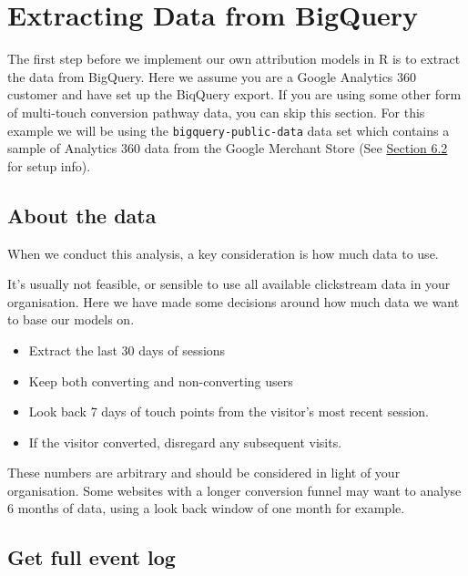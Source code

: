 \documentclass[]{book}
\providecommand{\tightlist}{%
  \setlength{\itemsep}{0pt}\setlength{\parskip}{0pt}}
\begin{document}
\hypertarget{extracting-data-from-bigquery}{%
\chapter{Extracting Data from BigQuery}\label{extracting-data-from-bigquery}}

The first step before we implement our own attribution models in R is to extract
the data from BigQuery. Here we assume you are a Google Analytics 360 customer and have set up the
BiqQuery export. If you are using some other form of multi-touch conversion pathway data, you
can skip this section. For this example we will be using the \texttt{bigquery-public-data} data set which
contains a sample of Analytics 360 data from the Google Merchant Store (See
\protect\hyperlink{setup-1}{Section 6.2} for setup info).

\hypertarget{about-the-data}{%
\section{About the data}\label{about-the-data}}

When we conduct this analysis, a key consideration is how much data to use.

It's usually not feasible, or sensible to use all available clickstream data
in your organisation. Here we have made some decisions around how much data we
want to base our models on.

\begin{itemize}
\tightlist
\item
  Extract the last 30 days of sessions\\
\item
  Keep both converting and non-converting users\\
\item
  Look back 7 days of touch points from the visitor's most recent session.\\
\item
  If the visitor converted, disregard any subsequent visits.
\end{itemize}

These numbers are arbitrary and should be considered in light of your
organisation. Some websites with a longer conversion funnel may want to analyse
6 months of data, using a look back window of one month for example.

\hypertarget{get-full-event-log}{%
\section{Get full event log}\label{get-full-event-log}}
\end{document}
